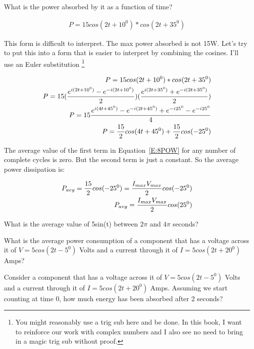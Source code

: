 What is the power absorbed by it as a function of time?

\begin{align}
P=15cos(2t+10^0)*cos(2t+35^0)
\end{align}

This form is difficult to interpret. The max power absorbed is not 15W. Let's try to put this into a form that is easier to interpret by combining the cosines. I'll use an Euler substitution \footnote{You might reasonably use a trig sub here and be done. In this book, I want to reinforce our work with complex numbers and I also see no need to bring in a magic trig sub without proof.}

\begin{align}
P=15cos(2t+10^0)*cos(2t+35^0) \notag\\
P = 15(\frac{e^{i(2t+10^0)}-e^{-i(2t+10^0)}}{2})(\frac{e^{i(2t+35^0)}+e^{-i(2t+35^0)}}{2})\notag\\
P = 15\frac{e^{i(4t+45^0)}-e^{-i(2t+45^0)}+e^{-i25^0}-e^{-i25^0}}{4}\notag\\
P = \frac{15}{2}cos(4t+45^0)+\frac{15}{2}cos(-25^0) \label{E:8POW}
\end{align}

The average value of the first term in Equation~\eqref{E:8POW} for any number of complete cycles is zero. But the second term is just a constant. So the average power dissipation is:

\begin{align}
P_{avg} = \frac{15}{2}cos(-25^0)=\frac{I_{max}V_{max}}{2}cos(-25^0) \notag\\
P_{avg}=\frac{I_{max}V_{max}}{2}cos(25^0)
\end{align}

\begin{alevel}
What is the average value of 5sin(t) between $2\pi$ and $4\pi$ seconds?
\end{alevel}

\begin{blevel}
What is the average power consumption of a component that has a voltage across it of $V=5cos(2t-5^0)$ Volts  and a current through it of $I=5cos(2t+20^0)$ Amps?
\end{blevel}

\begin{clevel}
Consider a component that has a voltage across it of $V=5cos(2t-5^0)$ Volts  and a current through it of $I=5cos(2t+20^0)$ Amps. Assuming we start counting at time 0, how much energy has been absorbed after 2 seconds?
\end{clevel}
